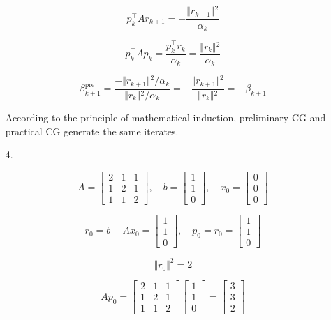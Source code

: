 \documentclass[11pt,a4paper]{article}
\begin{document}
\begin{enumerate}
    $$
    p_k^\top Ar_{k+1} = -\frac{\Vert{}r_{k+1}\Vert{}^2}{\alpha_k}
    $$

    $$
    p_k^\top Ap_k = \frac{p_k^\top r_k}{\alpha_k} = \frac{\Vert{}r_k\Vert{}^2}{\alpha_k}
    $$

    $$
    \beta_{k+1}^{\text{pre}} = \frac{-\Vert{}r_{k+1}\Vert{}^2 / \alpha_k}{\Vert{}r_k\Vert{}^2 / \alpha_k} = -\frac{\Vert{}r_{k+1}\Vert{}^2}{\Vert{}r_k\Vert{}^2} = -\beta_{k+1}
    $$

    According to the principle of mathematical induction, preliminary CG and practical CG generate the same iterates.

    \item[4. ]
    
    $$
    A
    =
    \begin{bmatrix}
        2 & 1 & 1 \\
        1 & 2 & 1 \\
        1 & 1 & 2
    \end{bmatrix}
    , \quad
    b
    =
    \begin{bmatrix}
        1 \\
        1 \\
        0
    \end{bmatrix}
    , \quad
    x_0
    =
    \begin{bmatrix}
        0 \\
        0 \\
        0
    \end{bmatrix}
    $$

    $$
    r_0 = b - A x_0
    =
    \begin{bmatrix}
        1 \\
        1 \\
        0
    \end{bmatrix}
    , \quad
    p_0 = r_0
    =
    \begin{bmatrix}
        1 \\
        1 \\
        0
    \end{bmatrix}
    $$

    $$
    \Vert r_0 \Vert ^2 = 2
    $$

    $$
    A p_0
    =
    \begin{bmatrix}
        2 & 1 & 1 \\
        1 & 2 & 1 \\
        1 & 1 & 2
    \end{bmatrix}
    \begin{bmatrix}
        1 \\
        1 \\
        0
    \end{bmatrix}
    =
    \begin{bmatrix}
        3 \\
        3 \\
        2
    \end{bmatrix}
    $$


\end{enumerate}
\end{document}
